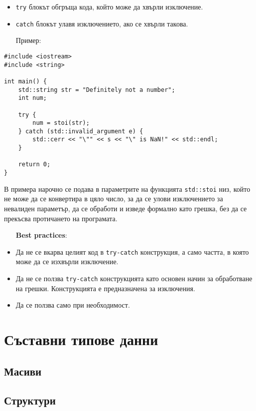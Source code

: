 \documentclass[oneside]{book}
\newcommand*{\code}[1]{\texttt{#1}}
\begin{document}
\begin{itemize}
    \item \code{try} блокът обгръща кода, който може да хвърли изключение.
    \item \code{catch} блокът улавя изключението, ако се хвърли такова.
\end{itemize}
\pagebreak
\begin{itemize}\item[Пример:]\end{itemize}
\begin{mdframed}\begin{lstlisting}
#include <iostream>
#include <string>

int main() {
    std::string str = "Definitely not a number";
    int num;

    try {
        num = stoi(str);
    } catch (std::invalid_argument e) {
        std::cerr << "\"" << s << "\" is NaN!" << std::endl;
    }

    return 0;
}
\end{lstlisting}\end{mdframed}

В примера нарочно се подава в параметрите на функцията \code{std::stoi} низ, който не може да се конвертира в цяло число,
за да се улови изключението за невалиден параметър, да се обработи и изведе формално като грешка, без да се прекъсва протичането на програмата.

\begin{itemize}\item[] \textbf{Best practices}:\end{itemize}
\begin{itemize}
    \item Да не се вкарва целият код в \code{try-catch} конструкция, а само частта, в която може да се изхвърли изключение.
    \item Да не се ползва \code{try-catch} конструкцията като основен начин за обработване на грешки. Конструкцията е предназначена за изключения.
    \item Да се ползва само при необходимост. 
\end{itemize}
\chapter{Съставни типове данни}
\section{Масиви}\label{sec:array}
\section{Структури}
\end{document}
